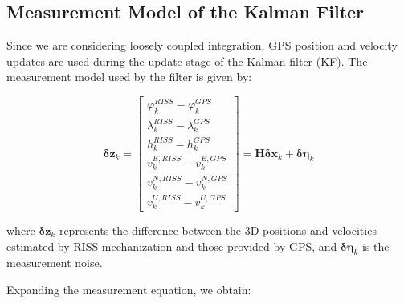 \documentclass[conference]{IEEEtran}
\begin{document}
\subsection{Measurement Model of the Kalman Filter}

Since we are considering loosely coupled integration, GPS position and velocity updates are used during the update stage of the Kalman filter (KF). The measurement model used by the filter is given by:

\begin{equation}
    \boldsymbol{\delta z}_k =
    \begin{bmatrix}
        \varphi_k^{RISS} - \varphi_k^{GPS} \\
        \lambda_k^{RISS} - \lambda_k^{GPS} \\
        h_k^{RISS} - h_k^{GPS} \\
        v_{k}^{E,RISS} - v_{k}^{E,GPS} \\
        v_{k}^{N,RISS} - v_{k}^{N,GPS} \\
        v_{k}^{U,RISS} - v_{k}^{U,GPS}
    \end{bmatrix}
    = \mathbf{H} \boldsymbol{\delta x}_k + \boldsymbol{\delta \eta}_k
    \label{eq:measurement_model}
\end{equation}

where $\boldsymbol{\delta z}_k$ represents the difference between the 3D positions and velocities estimated by RISS mechanization and those provided by GPS, and $\boldsymbol{\delta \eta}_k$ is the measurement noise.

Expanding the measurement equation, we obtain:
\end{document}
